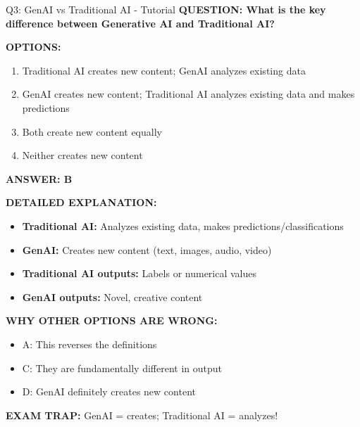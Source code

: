 \documentclass[8pt]{beamer}
\begin{document}
	\begin{frame}{Q3: GenAI vs Traditional AI - Tutorial}
		\fontsize{6.5}{7.5}\selectfont
		\textbf{QUESTION: What is the key difference between Generative AI and Traditional AI?}
		
		\vspace{0.1cm}
		\textbf{OPTIONS:}
		\begin{enumerate}
			\item Traditional AI creates new content; GenAI analyzes existing data
			\item GenAI creates new content; Traditional AI analyzes existing data and makes predictions
			\item Both create new content equally
			\item Neither creates new content
		\end{enumerate}
		
		\vspace{0.1cm}
		\textcolor{myblue}{\textbf{ANSWER: B}}
		
		\vspace{0.1cm}
		\textbf{DETAILED EXPLANATION:}
		\begin{itemize}
			\item \textbf{Traditional AI:} Analyzes existing data, makes predictions/classifications
			\item \textbf{GenAI:} Creates new content (text, images, audio, video)
			\item \textbf{Traditional AI outputs:} Labels or numerical values
			\item \textbf{GenAI outputs:} Novel, creative content
		\end{itemize}
		
		\vspace{0.1cm}
		\textcolor{myred}{\textbf{WHY OTHER OPTIONS ARE WRONG:}}
		\begin{itemize}
			\item \textcolor{myred}{A:} This reverses the definitions
			\item \textcolor{myred}{C:} They are fundamentally different in output
			\item \textcolor{myred}{D:} GenAI definitely creates new content
		\end{itemize}
		
		\textcolor{myred}{\textbf{EXAM TRAP:}} GenAI = \textcolor{myblue}{creates}; Traditional AI = \textcolor{myblue}{analyzes}!
	\end{frame}
	
\end{document}
